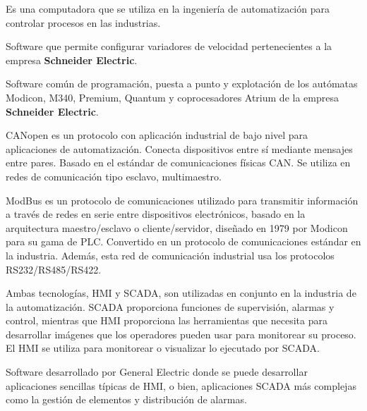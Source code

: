 \begin{tcolorbox}[colback=blue!5!white,colframe=blue!75!black,title=PLC]
	Es una computadora que se utiliza en la ingeniería de automatización para controlar procesos en las industrias.
\end{tcolorbox}

\begin{tcolorbox}[colback=blue!5!white,colframe=blue!75!black,title=SoMove]
	Software que permite configurar variadores de velocidad pertenecientes a la empresa \textbf{Schneider Electric}.
\end{tcolorbox}

\begin{tcolorbox}[colback=blue!5!white,colframe=blue!75!black,title=Unity Pro]
	Software común de programación, puesta a punto y
	explotación de los autómatas Modicon, M340, Premium, Quantum y
	coprocesadores Atrium de la empresa \textbf{Schneider Electric}.
\end{tcolorbox}

\begin{tcolorbox}[colback=blue!5!white,colframe=blue!75!black,title=CANopen]
	CANopen es un protocolo con aplicación industrial de bajo nivel para aplicaciones de automatización. Conecta dispositivos entre sí mediante mensajes entre pares. Basado en el estándar de comunicaciones físicas CAN. Se utiliza en redes de comunicación tipo esclavo, multimaestro. 
\end{tcolorbox}

\begin{tcolorbox}[colback=blue!5!white,colframe=blue!75!black,title=ModBus]
	ModBus es un protocolo de comunicaciones utilizado para transmitir información a través de redes en serie entre dispositivos electrónicos, basado en la arquitectura maestro/esclavo o cliente/servidor, diseñado en 1979 por Modicon para su gama de PLC. Convertido en un protocolo de comunicaciones estándar en la industria. Además, esta red de comunicación industrial usa los protocolos RS232/RS485/RS422.
\end{tcolorbox}

\begin{tcolorbox}[colback=blue!5!white,colframe=blue!75!black,title=HMI - SCADA]
	Ambas tecnologías, HMI y SCADA, son utilizadas en conjunto en la industria de la automatización. SCADA proporciona funciones de supervisión, alarmas y control, mientras que HMI proporciona las herramientas que necesita para desarrollar imágenes que los operadores pueden usar para monitorear su proceso. El HMI se utiliza para monitorear o visualizar lo ejecutado por SCADA.
\end{tcolorbox}

\begin{tcolorbox}[colback=blue!5!white,colframe=blue!75!black,title=iFIX]
	Software desarrollado por General Electric donde se puede desarrollar aplicaciones sencillas típicas de HMI, o bien, aplicaciones SCADA más complejas como la gestión de elementos y distribución de alarmas.
\end{tcolorbox}
\newpage